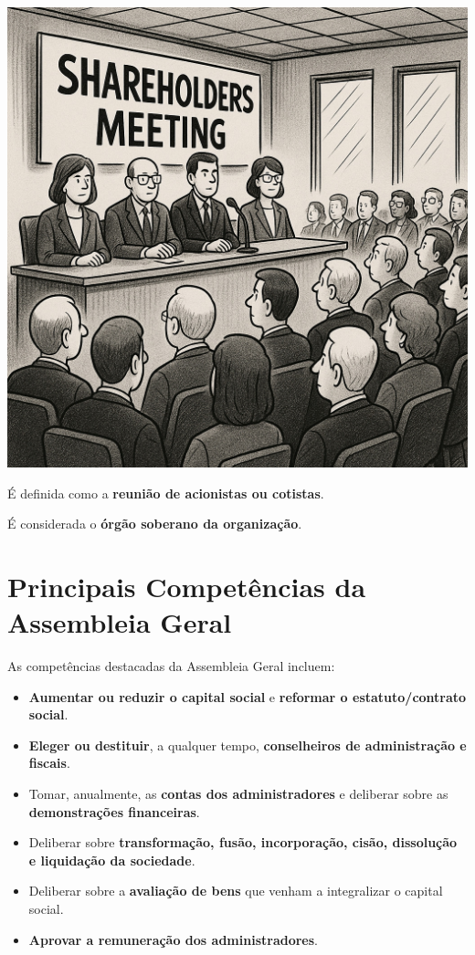 \documentclass[
]{book}
\begin{document}
\includegraphics[width=5.36458in,height=\textheight]{images/03-2025-08-19_20/01-assembleia_cotistas.jpg}

É definida como a \textbf{reunião de acionistas ou cotistas}.

É considerada o \textbf{órgão soberano da organização}.

\section{\texorpdfstring{\textbf{Principais Competências da Assembleia Geral}}{Principais Competências da Assembleia Geral}}\label{principais-competuxeancias-da-assembleia-geral}

As competências destacadas da Assembleia Geral incluem:

\begin{itemize}
\item
  \textbf{Aumentar ou reduzir o capital social} e \textbf{reformar o estatuto/contrato social}.
\item
  \textbf{Eleger ou destituir}, a qualquer tempo, \textbf{conselheiros de administração e fiscais}.
\item
  Tomar, anualmente, as \textbf{contas dos administradores} e deliberar sobre as \textbf{demonstrações financeiras}.
\item
  Deliberar sobre \textbf{transformação, fusão, incorporação, cisão, dissolução e liquidação da sociedade}.
\item
  Deliberar sobre a \textbf{avaliação de bens} que venham a integralizar o capital social.
\item
  \textbf{Aprovar a remuneração dos administradores}.
\end{itemize}
\end{document}
